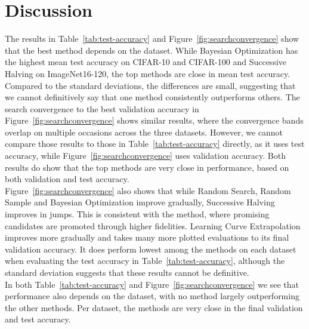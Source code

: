 \documentclass[12pt]{article}
\begin{document}
\section{Discussion}
The results in Table~\ref{tab:test-accuracy} and Figure~\ref{fig:searchconvergence} show that the best method depends on the dataset. While Bayesian Optimization has the highest mean test accuracy on CIFAR-10 and CIFAR-100 and Successive Halving on ImageNet16-120, the top methods are close in mean test accuracy. Compared to the standard deviations, the differences are small, suggesting that we cannot definitively say that one method consistently outperforms others. The search convergence to the best validation accuracy in Figure~\ref{fig:searchconvergence} shows similar results, where the convergence bands overlap on multiple occasions across the three datasets. However, we cannot compare those results to those in Table~\ref{tab:test-accuracy} directly, as it uses test accuracy, while Figure~\ref{fig:searchconvergence} uses validation accuracy. Both results do show that the top methods are very close in performance, based on both validation and test accuracy. \\
Figure~\ref{fig:searchconvergence} also shows that while Random Search, Random Sample and Bayesian Optimization improve gradually, Successive Halving improves in jumps. This is consistent with the method, where promising candidates are promoted through higher fidelities. Learning Curve Extrapolation improves more gradually and takes many more plotted evaluations to its final validation accuracy. It does perform lowest among the methods on each dataset when evaluating the test accuracy in Table~\ref{tab:test-accuracy}, although the standard deviation suggests that these results cannot be definitive. \\
In both Table~\ref{tab:test-accuracy} and Figure~\ref{fig:searchconvergence} we see that performance also depends on the dataset, with no method largely outperforming the other methods. Per dataset, the methods are very close in the final validation and test accuracy.
\end{document}
